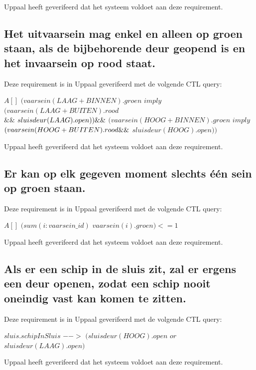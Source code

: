 \documentclass{article} %
\begin{document}
Uppaal heeft geverifeerd dat het systeem voldoet aan deze requirement.
\newpage

\subsection{Het uitvaarsein mag enkel en alleen op groen staan, als de bijbehorende deur geopend is en het invaarsein op rood staat.}

Deze requirement is in Uppaal geverifeerd met de volgende CTL query:

\begin{boxA}
    $A[]$ $(vaarsein(LAAG + BINNEN).groen$ $imply$ $(vaarsein(LAAG + BUITEN).rood$ \\ $ \&\&$ $sluisdeur(LAAG).open)) \\ \&\& $ $(vaarsein(HOOG + BINNEN).groen$ $imply$ $(vaarsein(HOOG + BUITEN).rood \\ \&\&$ $sluisdeur(HOOG).open))$
\end{boxA}


Uppaal heeft geverifeerd dat het systeem voldoet aan deze requirement.

\subsection{Er kan op elk gegeven moment slechts één sein op groen staan.}

Deze requirement is in Uppaal geverifeerd met de volgende CTL query:

\begin{boxA}
    $A[]$ $(sum (i : vaarsein\_id)$ $vaarsein(i).groen) <= 1$
\end{boxA}

Uppaal heeft geverifeerd dat het systeem voldoet aan deze requirement.

\subsection{Als er een schip in de sluis zit, zal er ergens een deur openen, zodat een schip nooit oneindig vast kan komen te zitten.}

Deze requirement is in Uppaal geverifeerd met de volgende CTL query:

\begin{boxA}
    $sluis.schipInSluis$ $-->$ $(sluisdeur(HOOG).open$ $or$ $sluisdeur(LAAG).open)$
\end{boxA}

Uppaal heeft geverifeerd dat het systeem voldoet aan deze requirement.
\end{document}
